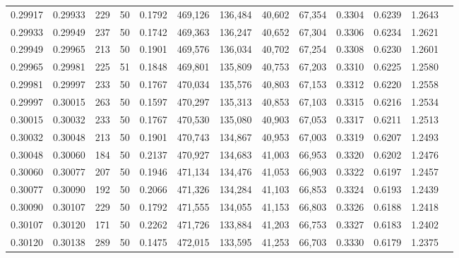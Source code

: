 \begin{tabular}{rrrrrrrrrrrrr}
0.29917 & 0.29933 &   229 &  50 &                                     0.1792 & 469,126 & 136,484 &  40,602 &  67,354 & 0.3304 & 0.6239 & 1.2643 \\
0.29933 & 0.29949 &   237 &  50 &                                     0.1742 & 469,363 & 136,247 &  40,652 &  67,304 & 0.3306 & 0.6234 & 1.2621 \\
0.29949 & 0.29965 &   213 &  50 &                                     0.1901 & 469,576 & 136,034 &  40,702 &  67,254 & 0.3308 & 0.6230 & 1.2601 \\
0.29965 & 0.29981 &   225 &  51 &                                     0.1848 & 469,801 & 135,809 &  40,753 &  67,203 & 0.3310 & 0.6225 & 1.2580 \\
0.29981 & 0.29997 &   233 &  50 &                                     0.1767 & 470,034 & 135,576 &  40,803 &  67,153 & 0.3312 & 0.6220 & 1.2558 \\
0.29997 & 0.30015 &   263 &  50 &                                     0.1597 & 470,297 & 135,313 &  40,853 &  67,103 & 0.3315 & 0.6216 & 1.2534 \\
0.30015 & 0.30032 &   233 &  50 &                                     0.1767 & 470,530 & 135,080 &  40,903 &  67,053 & 0.3317 & 0.6211 & 1.2513 \\
0.30032 & 0.30048 &   213 &  50 &                                     0.1901 & 470,743 & 134,867 &  40,953 &  67,003 & 0.3319 & 0.6207 & 1.2493 \\
0.30048 & 0.30060 &   184 &  50 &                                     0.2137 & 470,927 & 134,683 &  41,003 &  66,953 & 0.3320 & 0.6202 & 1.2476 \\
0.30060 & 0.30077 &   207 &  50 &                                     0.1946 & 471,134 & 134,476 &  41,053 &  66,903 & 0.3322 & 0.6197 & 1.2457 \\
0.30077 & 0.30090 &   192 &  50 &                                     0.2066 & 471,326 & 134,284 &  41,103 &  66,853 & 0.3324 & 0.6193 & 1.2439 \\
0.30090 & 0.30107 &   229 &  50 &                                     0.1792 & 471,555 & 134,055 &  41,153 &  66,803 & 0.3326 & 0.6188 & 1.2418 \\
0.30107 & 0.30120 &   171 &  50 &                                     0.2262 & 471,726 & 133,884 &  41,203 &  66,753 & 0.3327 & 0.6183 & 1.2402 \\
0.30120 & 0.30138 &   289 &  50 &                                     0.1475 & 472,015 & 133,595 &  41,253 &  66,703 & 0.3330 & 0.6179 & 1.2375 \\

\end{tabular}
